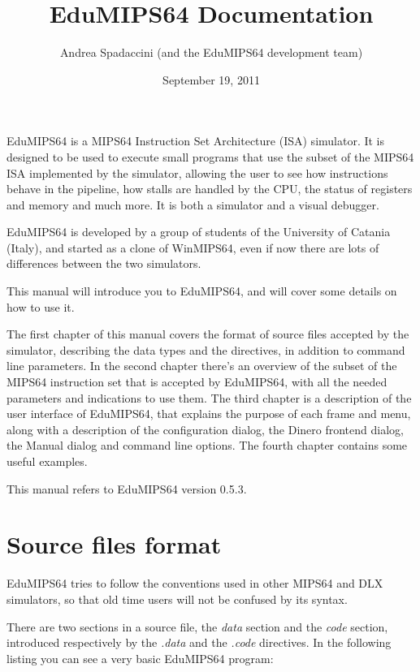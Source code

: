 \documentclass[letterpaper,10pt,english]{sphinxmanual}
\title{EduMIPS64 Documentation}
\date{September 19, 2011}
\author{Andrea Spadaccini (and the EduMIPS64 development team)}
\begin{document}
\maketitle
\tableofcontents
{}\label{index::doc}


EduMIPS64 is a MIPS64 Instruction Set Architecture (ISA) simulator. It is designed to
be used to execute small programs that use the subset of the MIPS64 ISA
implemented by the simulator, allowing the user to see how instructions behave
in the pipeline, how stalls are handled by the CPU, the status of registers and
memory and much more. It is both a simulator and a visual debugger.

EduMIPS64 is developed by a group of students of the University of Catania (Italy),
and started as a clone of WinMIPS64, even if now there are lots of differences
between the two simulators.

This manual will introduce you to EduMIPS64, and will cover some details on how to
use it.

The first chapter of this manual covers the format of source files accepted by
the simulator, describing the data types and the directives, in addition to
command line parameters. In the second chapter there's an overview of the subset
of the MIPS64 instruction set that is accepted by EduMIPS64, with all the needed
parameters and indications to use them. The third chapter is a description of
the user interface of EduMIPS64, that explains the purpose of each frame and menu,
along with a description of the configuration dialog, the Dinero frontend
dialog, the Manual dialog and command line options. The fourth chapter contains some useful examples.

This manual refers to EduMIPS64 version 0.5.3.


\chapter{Source files format}
\label{source-files-format:source-files-format}\label{source-files-format::doc}\label{source-files-format:welcome-to-the-edumips64-documentation}
EduMIPS64 tries to follow the conventions used in other MIPS64 and DLX simulators, so
that old time users will not be confused by its syntax.

There are two sections in a source file, the \emph{data} section and the
\emph{code} section, introduced respectively by the \emph{.data} and the
\emph{.code} directives. In the following listing you can see a very basic
EduMIPS64 program:
\end{document}
